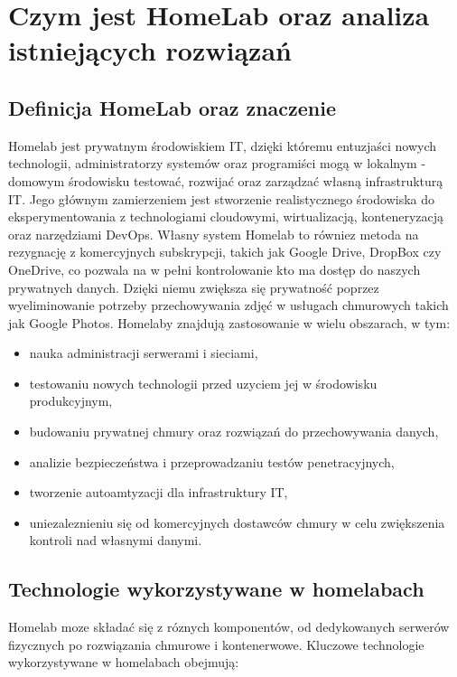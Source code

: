 \chapter{Czym jest HomeLab oraz analiza istniejących rozwiązań}

\section{Definicja HomeLab oraz znaczenie}
Homelab jest prywatnym środowiskiem IT, dzięki któremu entuzjaści nowych technologii, administratorzy systemów oraz programiści mogą w lokalnym - domowym środowisku testować, rozwijać oraz zarządzać własną infrastrukturą IT. Jego głównym zamierzeniem jest stworzenie realistycznego środowiska do eksperymentowania z technologiami cloudowymi, wirtualizacją, konteneryzacją oraz narzędziami DevOps. Własny system Homelab to równiez metoda na rezygnację z komercyjnych subskrypcji, takich jak Google Drive, DropBox czy OneDrive, co pozwala na w pełni kontrolowanie kto ma dostęp do naszych prywatnych danych. Dzięki niemu zwiększa się prywatność poprzez wyeliminowanie potrzeby przechowywania zdjęć w usługach chmurowych takich jak Google Photos.
Homelaby znajdują zastosowanie w wielu obszarach, w tym:
\begin{itemize}
    \item nauka administracji serwerami i sieciami,
    \item testowaniu nowych technologii przed uzyciem jej w środowisku produkcyjnym,
    \item budowaniu prywatnej chmury oraz rozwiązań do przechowywania danych,
    \item analizie bezpieczeństwa i przeprowadzaniu testów penetracyjnych,
    \item tworzenie autoamtyzacji dla infrastruktury IT,
    \item uniezaleznieniu się od komercyjnych dostawców chmury w celu zwiększenia kontroli nad własnymi danymi.
\end{itemize}

\section{Technologie wykorzystywane w homelabach}
Homelab moze składać się z róznych komponentów, od dedykowanych serwerów fizycznych po rozwiązania chmurowe i kontenerwowe. Kluczowe technologie wykorzystywane w homelabach obejmują:

